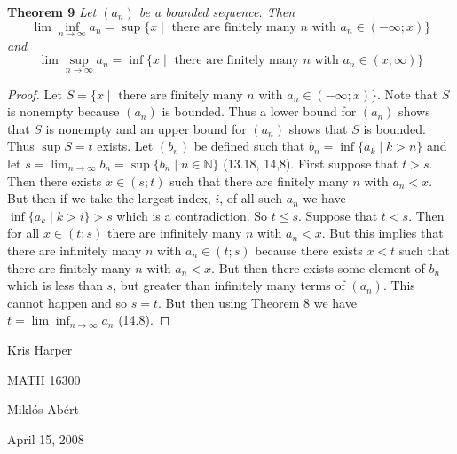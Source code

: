 \documentclass{article}
\begin{document}
\begin{flushleft}
\textbf{Theorem 9}
\textsl{Let $(a_n)$ be a bounded sequence. Then
\[
\lim \inf_{n \rightarrow \infty} a_n = \sup \{x \mid \text{ there are finitely many $n$ with $a_n \in (-\infty ; x)$} \}
\]
and
\[
\lim \sup_{n \rightarrow \infty} a_n = \inf \{x \mid \text{ there are finitely many $n$ with $a_n \in (x ; \infty)$} \}
\]}
\begin{proof}
Let $S = \{x \mid \text{ there are finitely many $n$ with $a_n \in (-\infty ; x)$} \}$. Note that $S$ is nonempty because $(a_n)$ is bounded. Thus a lower bound for $(a_n)$ shows that $S$ is nonempty and an upper bound for $(a_n)$ shows that $S$ is bounded. Thus $\sup S = t$ exists. Let $(b_n)$ be defined such that $b_n = \inf \{a_k \mid k > n\}$ and let $s = \lim_{n \rightarrow \infty} b_n = \sup \{b_n \mid n \in \mathbb{N}\}$ (13.18, 14,8). First suppose that $t > s$. Then there exists $x \in (s;t)$ such that there are finitely many $n$ with $a_n < x$. But then if we take the largest index, $i$, of all such $a_n$ we have $\inf \{a_k \mid k > i\} > s$ which is a contradiction. So $t \leq s$. Suppose that $t < s$. Then for all $x \in (t;s)$ there are infinitely many $n$ with $a_n < x$. But this implies that there are infinitely many $n$ with $a_n \in (t;s)$ because there exists $x < t$ such that there are finitely many $n$ with $a_n < x$. But then there exists some element of $b_n$ which is less than $s$, but greater than infinitely many terms of $(a_n)$. This cannot happen and so $s=t$. But then using Theorem 8 we have $t = \lim \inf_{n \rightarrow \infty} a_n$ (14.8).
\end{proof}

\end{flushleft}

\newpage

\begin{flushright}
Kris Harper

MATH 16300

Mikl\'{o}s Ab\'{e}rt

April 15, 2008
\end{flushright}
\end{document}
